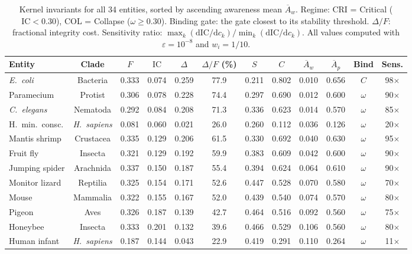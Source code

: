 \documentclass[
  aps,
  prd,
  twocolumn,
  superscriptaddress,
  nofootinbib,
  floatfix
]{revtex4-2}
\newcommand{\eps}{\varepsilon}
\newcommand{\dd}{\mathrm{d}}
\newcommand{\IC}{\mathrm{IC}}
\newcommand{\Aw}{\overline{A}_{\!w}}
\newcommand{\Ap}{\overline{A}_{\!p}}
\newcommand{\DeltaF}{\Delta\!/\!F}
\begin{document}
\begin{table}[t]
\caption{\label{tab:catalog}Kernel invariants for all 34
entities, sorted by ascending awareness mean $\Aw$.
Regime: CRI = Critical ($\IC < 0.30$), COL = Collapse
($\omega \geq 0.30$).  Binding gate: the gate closest to
its stability threshold.  $\DeltaF$: fractional integrity
cost.  Sensitivity ratio: $\max_k(\dd\IC/\dd c_k) /
\min_k(\dd\IC/\dd c_k)$.  All values computed with
$\eps = 10^{-8}$ and $w_i = 1/10$.}
\small
\begin{ruledtabular}
\begin{tabular}{lccccccccccc}
Entity & Clade & $F$ & $\IC$ & $\Delta$ & $\DeltaF$ (\%)
  & $S$ & $C$ & $\Aw$ & $\Ap$ & Bind & Sens. \\
\hline
\textit{E.~coli} & Bacteria & 0.333 & 0.074 & 0.259 & 77.9
  & 0.211 & 0.802 & 0.010 & 0.656 & $C$ & 98$\times$ \\
Paramecium & Protist & 0.306 & 0.078 & 0.228 & 74.4
  & 0.297 & 0.690 & 0.012 & 0.600 & $\omega$ & 90$\times$ \\
\textit{C.~elegans} & Nematoda & 0.292 & 0.084 & 0.208 & 71.3
  & 0.336 & 0.623 & 0.014 & 0.570 & $\omega$ & 85$\times$ \\
H.~min.~consc. & \textit{H.~sapiens} & 0.081 & 0.060 & 0.021 &
  26.0 & 0.260 & 0.112 & 0.036 & 0.126 & $\omega$ & 20$\times$ \\
Mantis shrimp & Crustacea & 0.335 & 0.129 & 0.206 & 61.5
  & 0.330 & 0.692 & 0.040 & 0.630 & $\omega$ & 95$\times$ \\
Fruit fly & Insecta & 0.321 & 0.129 & 0.192 & 59.9
  & 0.383 & 0.609 & 0.042 & 0.600 & $\omega$ & 90$\times$ \\
Jumping spider & Arachnida & 0.337 & 0.150 & 0.187 & 55.4
  & 0.394 & 0.624 & 0.064 & 0.610 & $\omega$ & 90$\times$ \\
Monitor lizard & Reptilia & 0.325 & 0.154 & 0.171 & 52.6
  & 0.447 & 0.528 & 0.070 & 0.580 & $\omega$ & 70$\times$ \\
Mouse & Mammalia & 0.322 & 0.155 & 0.167 & 52.0
  & 0.439 & 0.540 & 0.074 & 0.570 & $\omega$ & 80$\times$ \\
Pigeon & Aves & 0.326 & 0.187 & 0.139 & 42.7
  & 0.464 & 0.516 & 0.092 & 0.560 & $\omega$ & 75$\times$ \\
Honeybee & Insecta & 0.333 & 0.201 & 0.132 & 39.6
  & 0.466 & 0.529 & 0.106 & 0.560 & $\omega$ & 80$\times$ \\
Human infant & \textit{H.~sapiens} & 0.187 & 0.144 & 0.043
  & 22.9 & 0.419 & 0.291 & 0.110 & 0.264 & $\omega$ & 11$\times$ \\

\end{tabular}
\end{ruledtabular}
\end{table}
\end{document}
